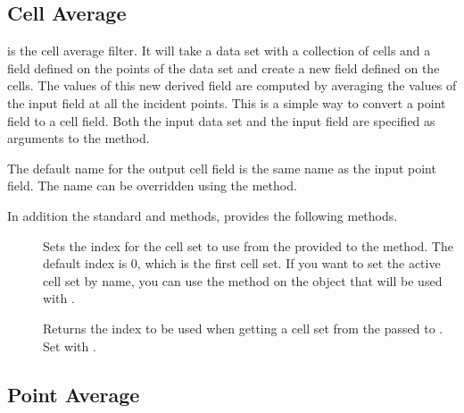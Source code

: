 
\subsection{Cell Average}


 is the cell average filter. It will take a data
set with a collection of cells and a field defined on the points of the
data set and create a new field defined on the cells. The values of this
new derived field are computed by averaging the values of the input field
at all the incident points. This is a simple way to convert a point field
to a cell field. Both the input data set and the input field are specified
as arguments to the  method.

The default name for the output cell field is the same name as the input
point field. The name can be overridden using the
 method.

In addition the standard  and
 methods,  provides the
following methods.

\begin{description}
\item[] Sets the index for the cell set to use
  from the  provided to the 
  method. The default index is 0, which is the first cell set. If you want
  to set the active cell set by name, you can use the
   method on the 
  object that will be used with .
\item[] Returns the index to be used when
  getting a cell set from the  passed to
  . Set with .
\end{description}


\subsection{Point Average}


